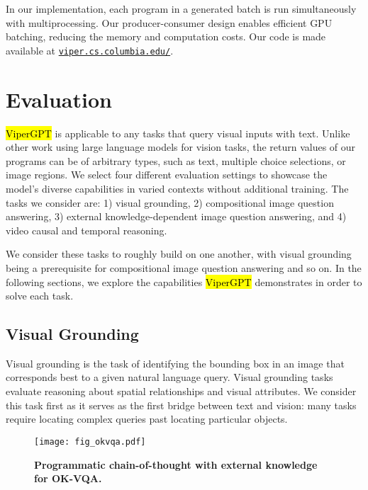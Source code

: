 \documentclass[10pt,twocolumn,letterpaper]{article}
\newcommand{\viper}[0]{{\small\fontfamily{txtt}\selectfont \textcolor{mygreen}{\hl{ViperGPT}}}\xspace}
\begin{document}
In our implementation, each program in a generated batch is run simultaneously with multiprocessing. 
Our producer-consumer design \cite{dijkstra_information_1972} enables efficient GPU batching, reducing the memory and computation costs. Our code is made available at \href{https://viper.cs.columbia.edu/}{\texttt{viper.cs.columbia.edu/}}.

\section{Evaluation}
\label{sec:experiments}
\viper is applicable to any tasks that query visual inputs with text. Unlike other work using large language models for vision tasks, the return values of our programs can be of arbitrary types, such as text, multiple choice selections, or image regions. We select four different evaluation settings to showcase the model's diverse capabilities in varied contexts without additional training. The tasks we consider are: 
1) visual grounding, 2) compositional image question answering, 3) external knowledge-dependent image question answering, and 4) video causal and temporal reasoning.

We consider these tasks to roughly build on one another, with visual grounding being a prerequisite for compositional image question answering and so on. In the following sections, we explore the capabilities \viper demonstrates in order to solve each task. 


    
\subsection{Visual Grounding}





Visual grounding is the task of identifying the bounding box in an image that corresponds best to a given natural language query. 
Visual grounding tasks evaluate reasoning about spatial relationships and visual attributes.
We consider this task first as it serves as the first bridge between text and vision: many tasks require locating complex queries past locating particular objects.

\begin{figure}[t]
    \texttt{[image: fig\_okvqa.pdf]}
    \caption{\textbf{Programmatic chain-of-thought with external knowledge for OK-VQA.}}
    \label{fig:okvqa}\vspace{-1em}
\end{figure}
\end{document}
